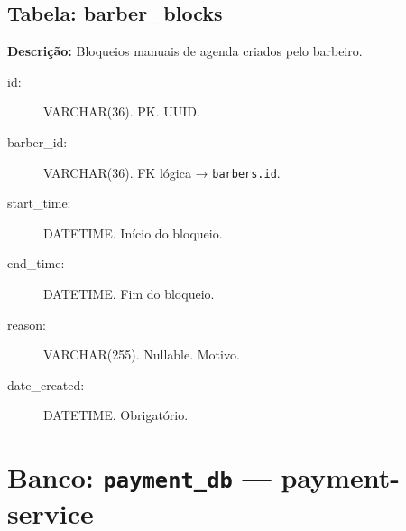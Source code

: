 \documentclass[
    12pt, 
    a4paper, 
    oneside, 
    chapter=TITLE, 
    section=TITLE
]{abntex2}
\begin{document}
\begin{apendicesenv}
\subsection*{Tabela: barber\_blocks}
\textbf{Descrição:} Bloqueios manuais de agenda criados pelo barbeiro.
\begin{description}
    \item[id:] VARCHAR(36). PK. UUID.
    \item[barber\_id:] VARCHAR(36). FK lógica → \texttt{barbers.id}.
    \item[start\_time:] DATETIME. Início do bloqueio.
    \item[end\_time:] DATETIME. Fim do bloqueio.
    \item[reason:] VARCHAR(255). Nullable. Motivo.
    \item[date\_created:] DATETIME. Obrigatório.
\end{description}

\section*{Banco: \texttt{payment\_db} — payment-service}


\end{apendicesenv}
\end{document}
